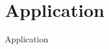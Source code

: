 \chapter{Application}\label{chap:application}
Application

\cite{Schwartz2014a,Hossfeld2015,Schwartz2013b}